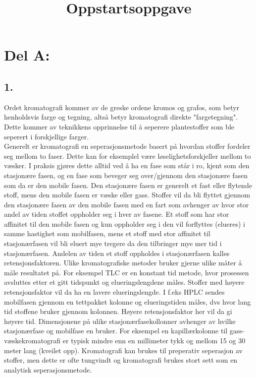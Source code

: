 \title{\textbf{Oppstartsoppgave}}
\maketitle

\section*{Del A:}

\subsection*{1.}

Ordet kromatografi kommer av de greske ordene kromos og grafos, som betyr henholdsvis farge og tegning, altså betyr kromatografi direkte "fargetegning". Dette kommer av teknikkens opprinnelse til å seperere plantestoffer som ble seperert i forskjellige farger.
\smallskip
\\
Generelt er kromatografi en seperasjonsmetode basert på hvordan stoffer fordeler seg mellom to faser. Dette kan for eksemplel være løselighetsforskjeller mellom to væsker. I praksis gjøres dette alltid ved å ha en fase som står i ro, kjent som den stasjonære fasen, og en fase som beveger seg over/gjennom den stasjonære fasen som da er den mobile fasen. Den stasjonære fasen er generelt et fast eller flytende stoff, mens den mobile fasen er væske eller gass. Stoffer vil da bli flyttet gjennom den stasjonære fasen av den mobile fasen med en fart som avhenger av hvor stor andel av tiden stoffet oppholder seg i hver av fasene. Et stoff som har stor affinitet til den mobile fasen og kun oppholder seg i den vil forflyttes (elueres) i samme hastighet som mobilfasen, mens et stoff med stor affinitet til stasjonærfasen vil bli eluert mye tregere da den tilbringer mye mer tid i stasjonærfasen. Andelen av tiden et stoff oppholdes i stasjonærfasen kalles retensjonsfaktoren. Ulike kromatografiske metoder bruker gjerne ulike måter å måle resultatet på. For eksempel TLC er en konstant tid metode, hvor prosessen avsluttes etter et gitt tidspunkt og elueringslengdene måles. Stoffer med høyere retensjonsfaktor vil da ha en lavere elueringslengde. I f.eks HPLC sendes mobilfasen gjennom en tettpakket kolonne og elueringstiden måles, dvs hvor lang tid stoffene bruker gjennom kolonnen. Høyere retensjonsfaktor her vil da gi høyere tid. Dimensjonene på ulike stasjonærfasekollonner avhenger av hvilke stasjonærfase og mobilfase en bruker. For eksempel en kapillærkolonne til gass-væskekromatografi er typisk mindre enn en millimeter tykk og mellom 15 og 30 meter lang (kveilet opp). Kromatografi kan brukes til preperativ seperasjon av stoffer, men dette er ofte tungvindt og kromatografi brukes stort sett som en analytisk seperasjonsmetode.


